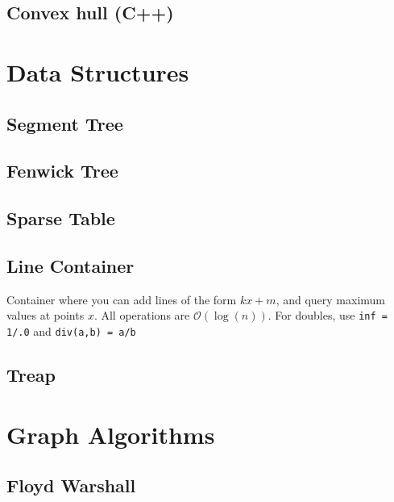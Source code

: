 \documentclass{article}
\begin{document}
\subsection*{Convex hull (C++)}


\section*{Data Structures}

\subsection*{Segment Tree}



\subsection*{Fenwick Tree}


\subsection*{Sparse Table}


\subsection*{Line Container}
Container where you can add lines of the form $kx + m$, and query maximum values at points $x$.
All operations are $\mathcal{O}(\log(n))$. For doubles, use \lstinline{inf = 1/.0} and \lstinline{div(a,b) = a/b}


\subsection*{Treap}


\pagebreak

\section*{Graph Algorithms}

\subsection*{Floyd Warshall}
\end{document}
